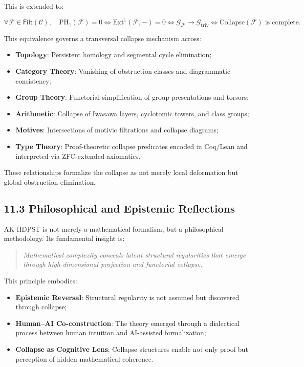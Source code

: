 \documentclass[11pt]{article}
\begin{document}
This is extended to:

\[
\forall \mathcal{F} \in \mathsf{Filt}(\mathcal{C}), \quad 
\mathrm{PH}_1(\mathcal{F}) = 0 \iff 
\mathrm{Ext}^1(\mathcal{F}, -) = 0 \iff 
\mathcal{G}_{\mathcal{F}} \longrightarrow \mathcal{G}_{\mathrm{triv}} \iff 
\text{Collapse}(\mathcal{F}) \text{ is complete}.
\]

This equivalence governs a transversal collapse mechanism across:

\begin{itemize}
    \item \textbf{Topology}: Persistent homology and segmental cycle elimination;
    \item \textbf{Category Theory}: Vanishing of obstruction classes and diagrammatic consistency;
    \item \textbf{Group Theory}: Functorial simplification of group presentations and torsors;
    \item \textbf{Arithmetic}: Collapse of Iwasawa layers, cyclotomic towers, and class groups;
    \item \textbf{Motives}: Intersections of motivic filtrations and collapse diagrams;
    \item \textbf{Type Theory}: Proof-theoretic collapse predicates encoded in Coq/Lean and interpreted via ZFC-extended axiomatics.
\end{itemize}

These relationships formalize the collapse as not merely local deformation but global obstruction elimination.

\subsection*{11.3 Philosophical and Epistemic Reflections}

AK-HDPST is not merely a mathematical formalism, but a philosophical methodology. Its fundamental insight is:

\begin{quote}
\textit{Mathematical complexity conceals latent structural regularities that emerge through high-dimensional projection and functorial collapse.}
\end{quote}

This principle embodies:

\begin{itemize}
    \item \textbf{Epistemic Reversal}: Structural regularity is not assumed but discovered through collapse;
    \item \textbf{Human–AI Co-construction}: The theory emerged through a dialectical process between human intuition and AI-assisted formalization;
    \item \textbf{Collapse as Cognitive Lens}: Collapse structures enable not only proof but perception of hidden mathematical coherence.
\end{itemize}
\end{document}
